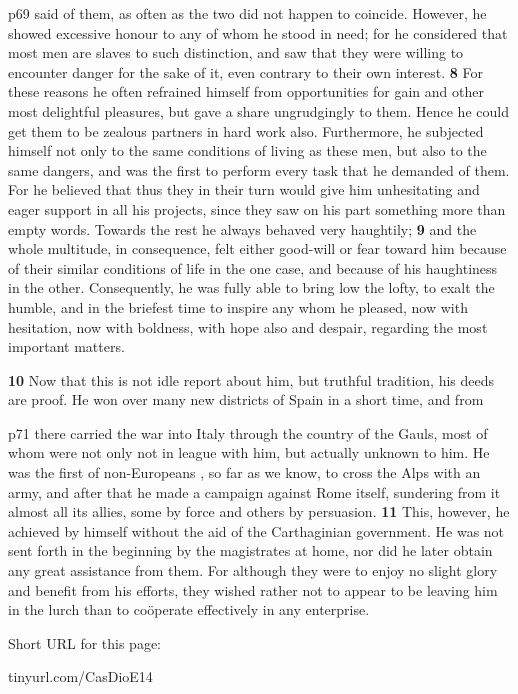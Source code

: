 p69 said of them, as often as the two did not happen to coincide. However, he showed excessive honour to any of whom he stood in need; for he considered that most men are slaves to such distinction, and saw that they were willing to encounter danger for the sake of it, even contrary to their own interest. \textbf{8} For these reasons he often refrained himself from opportunities for gain and other most delightful pleasures, but gave a share ungrudgingly to them. Hence he could get them to be zealous partners in hard work also. Furthermore, he subjected himself not only to the same conditions of living as these men, but also to the same dangers, and was the first to perform every task that he demanded of them. For he believed that thus they in their turn would give him unhesitating and eager support in all his projects, since they saw on his part something more than empty words. Towards the rest he always behaved very haughtily; \textbf{9} and the whole multitude, in consequence, felt either good-will or fear toward him because of their similar conditions of life in the one case, and because of his haughtiness in the other. Consequently, he was fully able to bring low the lofty, to exalt the humble, and in the briefest time to inspire any whom he pleased, now with hesitation, now with boldness, with hope also and despair, regarding the most important matters.

\textbf{10}
Now that this is not idle report about him, but truthful tradition, his deeds are proof. He won over many new districts of Spain in a short time, and from

p71 there carried the war into Italy through the country of the Gauls, most of whom were not only not in league with him, but actually unknown to him. He was the first of non-Europeans , so far as we know, to cross the Alps with an army, and after that he made a campaign against Rome itself, sundering from it almost all its allies, some by force and others by persuasion. \textbf{11} This, however, he achieved by himself without the aid of the Carthaginian government. He was not sent forth in the beginning by the magistrates at home, nor did he later obtain any great assistance from them. For although they were to enjoy no slight glory and benefit from his efforts, they wished rather not to appear to be leaving him in the lurch than to coöperate effectively in any enterprise.


Short URL for this page:

tinyurl.com/CasDioE14


